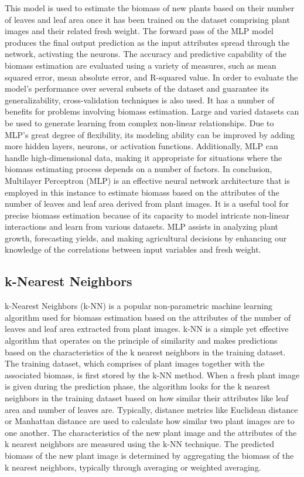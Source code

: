 \documentclass[a4paper,11pt]{report}%
\renewcommand{\\}{\vspace*{0.5\baselineskip} \newline}
\begin{document}
\noindent This model is used to estimate the biomass of new plants based on their number of leaves and leaf area once it has been trained on the dataset comprising plant images and their related fresh weight. The forward pass of the MLP model produces the final output prediction as the input attributes spread through the network, activating the neurons.
The accuracy and predictive capability of the biomass estimation are evaluated using a variety of measures, such as mean squared error, mean absolute error, and R-squared value. In order to evaluate the model's performance over several subsets of the dataset and guarantee its generalizability, cross-validation techniques is also used.
It has a number of benefits for problems involving biomass estimation. Large and varied datasets can be used to generate learning from complex non-linear relationships. Due to MLP's great degree of flexibility, its modeling ability can be improved by adding more hidden layers, neurons, or activation functions. Additionally, MLP can handle high-dimensional data, making it appropriate for situations where the biomass estimating process depends on a number of factors.
In conclusion, Multilayer Perceptron (MLP) is an effective neural network architecture that is employed in this instance to estimate biomass based on the attributes of the number of leaves and leaf area derived from plant images. It is a useful tool for precise biomass estimation because of its capacity to model intricate non-linear interactions and learn from various datasets. MLP assists in analyzing plant growth, forecasting yields, and making agricultural decisions by enhancing our knowledge of the correlations between input variables and fresh weight.

\subsection{k-Nearest Neighbors}
k-Nearest Neighbors (k-NN) is a popular non-parametric machine learning algorithm used for biomass estimation based on the attributes of the number of leaves and leaf area extracted from plant images. k-NN is a simple yet effective algorithm that operates on the principle of similarity and makes predictions based on the characteristics of the k nearest neighbors in the training dataset.
The training dataset, which comprises of plant images together with the associated biomass, is first stored by the k-NN method. When a fresh plant image is given during the prediction phase, the algorithm looks for the k nearest neighbors in the training dataset based on how similar their attributes like leaf area and number of leaves are.
Typically, distance metrics like Euclidean distance or Manhattan distance are used to calculate how similar two plant images are to one another. The characteristics of the new plant image and the attributes of the k nearest neighbors are measured using the k-NN technique. The predicted biomass of the new plant image is determined by aggregating the biomass of the k nearest neighbors, typically through averaging or weighted averaging.
\end{document}
